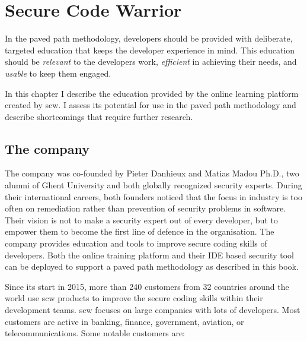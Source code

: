 \chapter{Secure Code Warrior}
\label{ch:scw}
\glsresetall

In the paved path methodology, developers should be provided with deliberate, targeted education that keeps the developer experience in mind.
This education should be \textit{relevant} to the developers work, \textit{efficient} in achieving their needs, and \textit{usable} to keep them engaged.

In this chapter I describe the education provided by the online learning platform created by \gls{scw}. 
I assess its potential for use in the paved path methodology and describe shortcomings that require further research.


\clearpage

\section{The company}
The company was co-founded by Pieter Danhieux and Matias Madou Ph.D., two alumni of Ghent University and both globally recognized security experts.
During their international careers, both founders noticed that the focus in industry is too often on remediation rather than prevention of \glspl{security problem} in software.
Their vision is not to make a security expert out of every developer, but to empower them to become the first line of defence in the organisation.
The company provides education and tools to improve secure coding skills of developers.
Both the online training platform and their IDE based security tool can be deployed to support a paved path methodology as described in this book.

Since its start in 2015, more than 240 customers from 32 countries around the world use \gls{scw} products to improve the secure coding skills within their development teams.
\Gls{scw} focuses on large companies with lots of developers. Most customers are active in banking, finance, government, aviation, or telecommunications. Some notable customers are:

